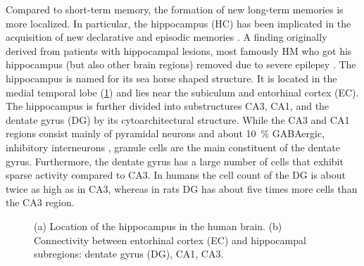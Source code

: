 Compared to short-term memory, the formation of new long-term memories is more localized.
In particular, the hippocampus (HC) has been implicated in the acquisition of new declarative and episodic memories \parencite{eichenbaum2001-1}.
A finding originally derived from patients with hippocampal lesions, most famously HM who got his hippocampus (but also other brain regions) removed due to severe epilepsy \parencite{penfield1958,scoville1957-1,squire2009}.
The hippocampus is named for its sea horse shaped structure.
It is located in the medial temporal lobe (\cref{fig:hc}) and lies near the subiculum and entorhinal cortex (EC).
The hippocampus is further divided into substructures CA3, CA1, and the dentate gyrus (DG) by its cytoarchitectural structure.
While the CA3 and CA1 regions consist mainly of pyramidal neurons and about \SI{10}{\percent} GABAergic, inhibitory interneurons \parencite{Freund1996}, granule cells are the main constituent of the dentate gyrus.
Furthermore, the dentate gyrus has a large number of cells that exhibit sparse activity compared to CA3.
In humans the cell count of the DG is about twice as high as in CA3, whereas in rats DG has about five times more cells than the CA3 region.
\begin{figure}
    \begin{addmargin*}[0mm]{-70.16pt}
        \hfill
        \hfill
        \hfill
        \caption[Hippocampal anatomy.]{(a) Location of the hippocampus in the human brain. (b) Connectivity between entorhinal cortex (EC) and hippocampal subregions: dentate gyrus (DG), CA1, CA3.}\label{fig:hc}
    \end{addmargin*}
\end{figure}

